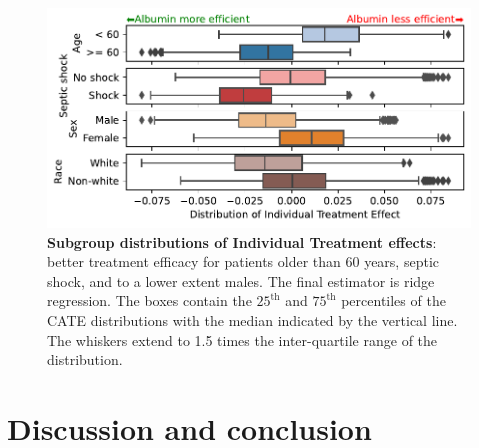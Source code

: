 \documentclass[10pt,letterpaper]{article}
\providecommand{\DIFaddbeginFL}{} %
\providecommand{\DIFaddendFL}{} %
\providecommand{\DIFdelbeginFL}{} %
\providecommand{\DIFdelendFL}{} %
\newcommand{\DIFscaledelfig}{0.5}
\newlength{\DIFdelgraphicswidth} %
\newlength{\DIFdelgraphicsheight} %
\newcommand{\DIFaddincludegraphics}[2][]{{\color{blue}\fbox{\DIFOincludegraphics[#1]{#2}}}} %
\newcommand{\DIFdelincludegraphics}[2][]{%
\sbox{\DIFdelgraphicsbox}{\DIFOincludegraphics[#1]{#2}}%
\settoboxwidth{\DIFdelgraphicswidth}{\DIFdelgraphicsbox} %
\settoboxtotalheight{\DIFdelgraphicsheight}{\DIFdelgraphicsbox} %
\scalebox{\DIFscaledelfig}{%
\parbox[b]{\DIFdelgraphicswidth}{\usebox{\DIFdelgraphicsbox}\\[-\baselineskip] \rule{\DIFdelgraphicswidth}{0em}}\llap{\resizebox{\DIFdelgraphicswidth}{\DIFdelgraphicsheight}{%
\setlength{\unitlength}{\DIFdelgraphicswidth}%
\begin{picture}(1,1)%
\thicklines\linethickness{2pt} %
{\color[rgb]{1,0,0}\put(0,0){\framebox(1,1){}}}%
{\color[rgb]{1,0,0}\put(0,0){\line( 1,1){1}}}%
{\color[rgb]{1,0,0}\put(0,1){\line(1,-1){1}}}%
\end{picture}%
}\hspace*{3pt}}} %
} %
\DeclareRobustCommand{\DIFaddbeginFL}{\DIFOaddbeginFL \let\includegraphics\DIFaddincludegraphics} %
\DeclareRobustCommand{\DIFaddendFL}{\DIFOaddendFL \let\includegraphics\DIFOincludegraphics} %
\DeclareRobustCommand{\DIFdelbeginFL}{\DIFOdelbeginFL \let\includegraphics\DIFdelincludegraphics} %
\DeclareRobustCommand{\DIFdelendFL}{\DIFOaddendFL \let\includegraphics\DIFOincludegraphics} %
\begin{document}
\begin{figure}[h!]
  \begin{minipage}{.4\linewidth}
    \caption{\textbf{Subgroup distributions of Individual Treatment
        effects}:
      better treatment efficacy for patients older than 60 years, septic shock,
      and to a lower extent males. The final estimator is ridge regression. The
      boxes contain the $25^\text{th}$ and $75^\text{th}$ percentiles of the CATE
      distributions with the median indicated by the vertical line. The whiskers
      extend to 1.5 times the inter-quartile range of the
      distribution.}\label{fig:albumin_for_sepsis:cate_results}
  \end{minipage}%
  \hfill%
  \begin{minipage}{.6\linewidth}
    \DIFdelbeginFL %
    \DIFdelendFL \DIFaddbeginFL \includegraphics[width=\linewidth]{img_final/Fig4.pdf}
    \DIFaddendFL \end{minipage}%
\end{figure}


\section*{Discussion and conclusion}\label{sec:discussion}

\end{document}
